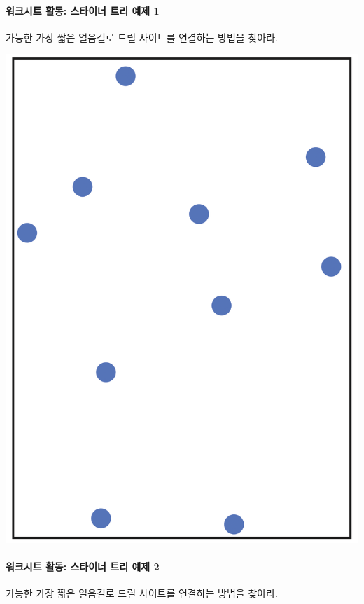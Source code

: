 \documentclass[]{article}
\begin{document}
\mbox{}\paragraph{워크시트 활동: 스타이너 트리 예제 1}\label{section-217}

가능한 가장 짧은 얼음길로 드릴 사이트를 연결하는 방법을 찾아라.

\includegraphics{csunplugged/04-part/img/ch16-steiner/15-steiner-04-drill-sites.png}

\mbox{}\paragraph{워크시트 활동: 스타이너 트리 예제 2}\label{section-218}

가능한 가장 짧은 얼음길로 드릴 사이트를 연결하는 방법을 찾아라.
\end{document}
